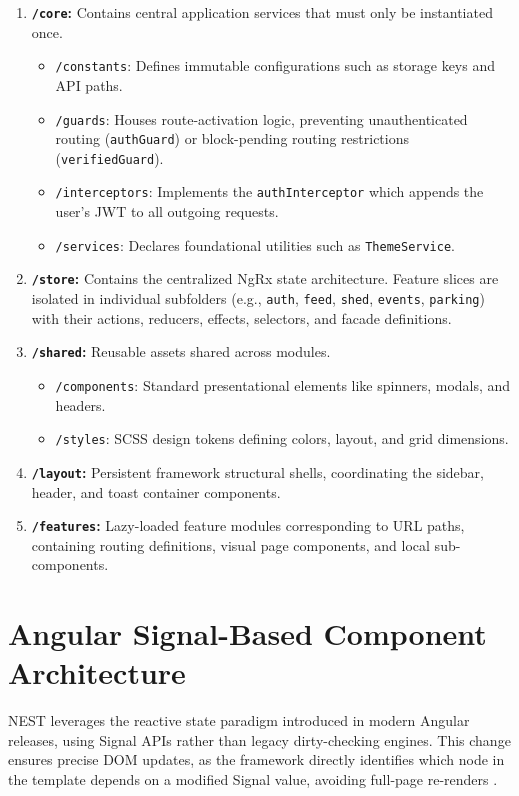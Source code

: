 \begin{enumerate}
    \item \textbf{\texttt{/core}:} Contains central application services that must only be instantiated once.
    \begin{itemize}
        \item \texttt{/constants}: Defines immutable configurations such as storage keys and API paths.
        \item \texttt{/guards}: Houses route-activation logic, preventing unauthenticated routing (\texttt{authGuard}) or block-pending routing restrictions (\texttt{verifiedGuard}).
        \item \texttt{/interceptors}: Implements the \texttt{authInterceptor} which appends the user's JWT to all outgoing requests.
        \item \texttt{/services}: Declares foundational utilities such as \texttt{ThemeService}.
    \end{itemize}
    \item \textbf{\texttt{/store}:} Contains the centralized NgRx state architecture. Feature slices are isolated in individual subfolders (e.g., \texttt{auth}, \texttt{feed}, \texttt{shed}, \texttt{events}, \texttt{parking}) with their actions, reducers, effects, selectors, and facade definitions.
    \item \textbf{\texttt{/shared}:} Reusable assets shared across modules.
    \begin{itemize}
        \item \texttt{/components}: Standard presentational elements like spinners, modals, and headers.
        \item \texttt{/styles}: SCSS design tokens defining colors, layout, and grid dimensions.
    \end{itemize}
    \item \textbf{\texttt{/layout}:} Persistent framework structural shells, coordinating the sidebar, header, and toast container components.
    \item \textbf{\texttt{/features}:} Lazy-loaded feature modules corresponding to URL paths, containing routing definitions, visual page components, and local sub-components.
\end{enumerate}

\section{Angular Signal-Based Component Architecture}
NEST leverages the reactive state paradigm introduced in modern Angular releases, using Signal APIs rather than legacy dirty-checking engines. This change ensures precise DOM updates, as the framework directly identifies which node in the template depends on a modified Signal value, avoiding full-page re-renders \cite{angularSignalsRfc}.

